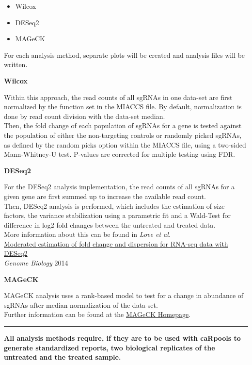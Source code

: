 \documentclass[]{article}
\providecommand{\tightlist}{%
  \setlength{\itemsep}{0pt}\setlength{\parskip}{0pt}}
\begin{document}
\begin{itemize}
\tightlist
\item
  Wilcox
\item
  DESeq2
\item
  MAGeCK
\end{itemize}

For each analysis method, separate plots will be created and analysis
files will be written.

\textbf{Wilcox}

Within this approach, the read counts of all sgRNAs in one data-set are
first normalized by the function set in the MIACCS file. By default,
normalization is done by read count division with the data-set median.\\
Then, the fold change of each population of sgRNAs for a gene is tested
against the population of either the non-targeting controls or randomly
picked sgRNAs, as defined by the random picks option within the MIACCS
file, using a two-sided Mann-Whitney-U test. P-values are corrected for
multiple testing using FDR.

\textbf{DESeq2}

For the DESeq2 analysis implementation, the read counts of all sgRNAs
for a given gene are first summed up to increase the available read
count.\\
Then, DESeq2 analysis is performed, which includes the estimation of
size-factors, the variance stabilization using a parametric fit and a
Wald-Test for difference in log2 fold changes between the untreated and
treated data.\\
More information about this can be found in \emph{Love et al.}\\
\href{http://www.ncbi.nlm.nih.gov/pubmed/25516281}{Moderated estimation
of fold change and dispersion for RNA-seq data with DESeq2}\\
\emph{Genome Biology} 2014

\textbf{MAGeCK}

MAGeCK analysis uses a rank-based model to test for a change in
abundance of sgRNAs after median normalization of the data-set.\\
Further information can be found at the
\href{http://sourceforge.net/projects/mageck/}{MAGeCK Homepage}.

\begin{center}\rule{0.5\linewidth}{\linethickness}\end{center}

\textbf{All analysis methods require, if they are to be used with
caRpools to generate standardized reports, two biological replicates of
the untreated and the treated sample.}
\end{document}
